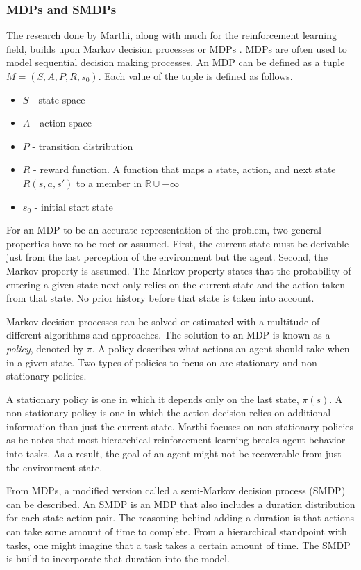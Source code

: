 \documentclass[jair,twoside,11pt,theapa]{article}
\begin{document}
\subsubsection{MDPs and SMDPs}
The research done by Marthi, along with much for the reinforcement learning field, builds upon Markov decision processes or MDPs \cite{Puterman:1994} \cite{bertsekas:1996}. MDPs are often used to model sequential decision making processes. An MDP can be defined as a tuple $M = (S, A, P, R, s_0)$. Each value of the tuple is defined as follows. 
\begin{itemize}
	\item $S$ - state space
	\item $A$ - action space
	\item $P$ - transition distribution
	\item $R$ - reward function. A function that maps a state, action, and next state $R(s,a,s')$ to a member in $\mathbb{R} \cup -\infty$
	\item $s_0$ - initial start state
\end{itemize}

For an MDP to be an accurate representation of the problem, two general properties have to be met or assumed. First, the current state must be derivable just from the last perception of the environment but the agent. Second, the Markov property is assumed. The Markov property states that the probability of entering a given state next only relies on the current state and the action taken from that state. No prior history before that state is taken into account. 

Markov decision processes can be solved or estimated with a multitude of different algorithms and approaches. The solution to an MDP is known as a \textit{policy}, denoted by $\pi$. A policy describes what actions an agent should take when in a given state. Two types of policies to focus on are stationary and non-stationary policies. 

A stationary policy is one in which it depends only on the last state, $\pi(s)$. A non-stationary policy is one in which the action decision relies on additional information than just the current state. Marthi focuses on non-stationary policies as he notes that most hierarchical reinforcement learning breaks agent behavior into tasks. As a result, the goal of an agent might not be recoverable from just the environment state. 

From MDPs, a modified version called a semi-Markov decision process (SMDP) can be described. An SMDP is an MDP that also includes a duration distribution for each state action pair. The reasoning behind adding a duration is that actions can take some amount of time to complete. From a hierarchical standpoint with tasks, one might imagine that a task takes a certain amount of time. The SMDP is build to incorporate that duration into the model. 
\end{document}
